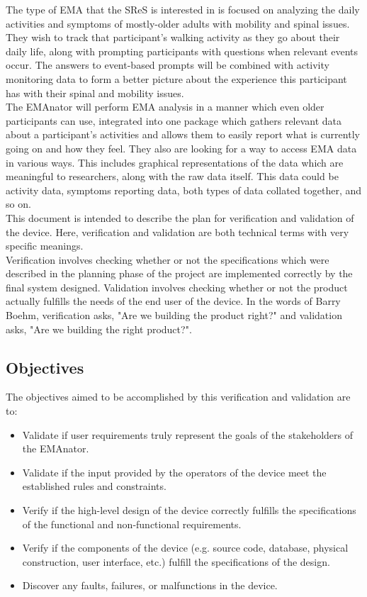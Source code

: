\documentclass[12pt, titlepage]{article}
\begin{document}
The type of EMA that the SReS is interested in is focused on analyzing the daily activities and symptoms of mostly-older adults with mobility and spinal issues. They wish to track that participant's walking activity as they go about their daily life, along with prompting participants with questions when relevant events occur. The answers to event-based prompts will be combined with activity monitoring data to form a better picture about the experience this participant has with their spinal and mobility issues.\\

The EMAnator will perform EMA analysis in a manner which even older participants can use, integrated into one package which gathers relevant data about a participant's activities and allows them to easily report what is currently going on and how they feel. They also are looking for a way to access EMA data in various ways. This includes graphical representations of the data which are meaningful to researchers, along with the raw data itself. This data could be activity data, symptoms reporting data, both types of data collated together, and so on. \\

This document is intended to describe the plan for verification and validation of the device. Here, verification and validation are both technical terms with very specific meanings.\\

Verification involves checking whether or not the specifications which were described in the planning phase of the project are implemented correctly by the final system designed. Validation involves checking whether or not the product actually fulfills the needs of the end user of the device. In the words of Barry Boehm, verification asks, "Are we building the product right?" and validation asks, "Are we building the right product?"\cite{pham_1999}.

\newpage

\subsection{Objectives}

The objectives aimed to be accomplished by this verification and validation are to:

\begin{itemize}
  \item Validate if user requirements truly represent the goals of the stakeholders of the EMAnator.
  \item Validate if the input provided by the operators of the device meet the established rules and constraints.
  \item Verify if the high-level design of the device correctly fulfills the specifications of the functional and non-functional requirements.
  \item Verify if the components of the device (e.g. source code, database, physical construction, user interface, etc.) fulfill the specifications of the design.
  \item Discover any faults, failures, or malfunctions in the device.
\end{itemize}
\end{document}
